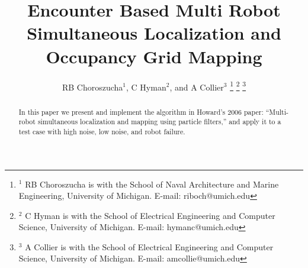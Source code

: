 \documentclass[letterpaper, 10 pt, conference]{ieeeconf}  %
\title{Encounter Based Multi Robot Simultaneous Localization and Occupancy Grid Mapping}
\author{RB Choroszucha$^{1}$, C Hyman$^{2}$, and A Collier$^{3}$ %
\thanks{$^{1}$ RB Choroszucha is with the School of Naval Architecture and Marine Engineering, University of Michigan.  E-mail: riboch{@}umich.edu}%
\thanks{$^{2}$ C Hyman is with the School of Electrical Engineering and Computer Science, University of Michigan. E-mail: {hymanc}{@}umich.edu}
\thanks{$^{3}$ A Collier is with the School of Electrical Engineering and Computer Science, University of Michigan. E-mail: {amcollie}{@}umich.edu}
}
\begin{document}
\maketitle
\thispagestyle{empty}
\pagestyle{empty}


\begin{abstract}

In this paper we present and implement the algorithm in Howard's 2006 paper: ``Multi-robot simultaneous localization and mapping using particle filters,''  and apply it to a test case with high noise, low noise, and robot failure.


\end{abstract}
















\addtolength{\textheight}{-12cm}   %







\end{document}
